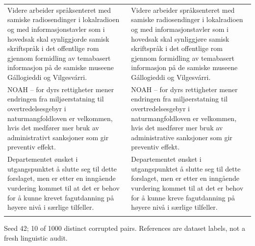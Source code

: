 \documentclass[10pt]{article}
\begin{document}
{\begin{tabular}{@{}>{\raggedright\arraybackslash}p{}@{\hspace{0.04\textwidth}}>{\raggedright\arraybackslash}p{}@{}}
Videre arbeider språksenteret med samiske radiosendinger i lokalradioen og med informasjonstavler som i hovedsak skal synliggjorde samisk skriftspråk i det offentlige rom gjennom formidling av temabasert informasjon på de samiske museene Gállogieddi og Vilgesvárri. & Videre arbeider språksenteret med samiske radiosendinger i lokalradioen og med informasjonstavler som i hovedsak skal synliggjøre samisk skriftspråk i det offentlige rom gjennom formidling av temabasert informasjon på de samiske museene Gállogieddi og Vilgesvárri. \\ \addlinespace[5pt]
NOAH – for dyrs rettigheter mener endringen fra miljøerstatning til overtredelsesgebyr i naturmangfoldloven er velkommen, hvis det medfører mer bruk av administrativt sanksjoner som gir preventiv effekt. & NOAH – for dyrs rettigheter mener endringen fra miljøerstatning til overtredelsesgebyr i naturmangfoldloven er velkommen, hvis det medfører mer bruk av administrative sanksjoner som gir preventiv effekt. \\ \addlinespace[5pt]
Departementet ønsket i utgangspunktet å slutte seg til dette forslaget, men er etter en inngående vurdering kommet til at det er behov for å kunne krevet fagutdanning på høyere nivå i særlige tilfeller. & Departementet ønsket i utgangspunktet å slutte seg til dette forslaget, men er etter en inngående vurdering kommet til at det er behov for å kunne kreve fagutdanning på høyere nivå i særlige tilfeller. \\ \addlinespace[5pt]
\bottomrule\end{tabular}}%
\ifdim\dimexpr\ht\pairtable+\dp\pairtable\relax>0.82\textheight%
\resizebox*{!}{0.82\textheight}{\usebox{\pairtable}}%
\else\usebox{\pairtable}\fi%
\par\smallskip\footnotesize Seed 42; 10 of 1000 distinct corrupted pairs. References are dataset labels, not a fresh linguistic audit.\normalsize
\clearpage
\end{document}

